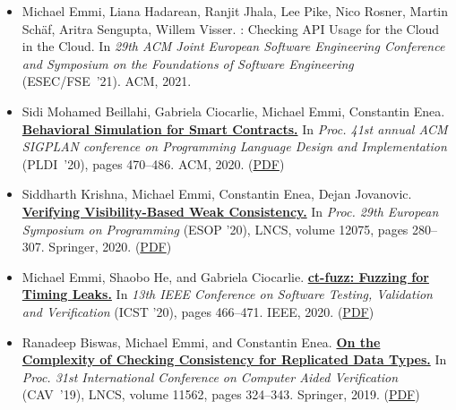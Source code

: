 \documentclass{article}
\begin{document}
  \begin{itemize}[leftmargin=0cm,label={}]

    \item Michael Emmi, Liana Hadarean, Ranjit Jhala, Lee Pike, Nico Rosner, Martin Schäf, Aritra Sengupta, Willem Visser. {\bfRAPID: Checking API Usage for the Cloud in the Cloud.} In \emph{ 29th ACM Joint European Software Engineering Conference and Symposium on the Foundations of Software Engineering } (ESEC/FSE ’21). ACM, 2021. 


    \item Sidi Mohamed Beillahi, Gabriela Ciocarlie, Michael Emmi, Constantin Enea. {\bf\href{%
    https://doi.org/10.1145/3385412.3386022}{%
    Behavioral Simulation for Smart Contracts.}} In \emph{ Proc. 41st annual ACM SIGPLAN conference on Programming Language Design and Implementation } (PLDI ’20), pages 470–486. ACM, 2020. (\href{https://michael-emmi.github.io/https://github.com/michael-emmi/research-papers/raw/master/conf-pldi-BeillahiCEE20.pdf}{PDF})


    \item Siddharth Krishna, Michael Emmi, Constantin Enea, Dejan Jovanovic. {\bf\href{%
    https://doi.org/10.1007/978-3-030-44914-8_11}{%
    Verifying Visibility-Based Weak Consistency.}} In \emph{ Proc. 29th European Symposium on Programming } (ESOP ’20), LNCS, volume 12075, pages 280–307. Springer, 2020. (\href{https://michael-emmi.github.io/https://github.com/michael-emmi/research-papers/raw/master/conf-esop-KrishnaEEJ20.pdf}{PDF})


    \item Michael Emmi, Shaobo He, and Gabriela Ciocarlie. {\bf\href{%
    https://doi.org/10.1109/ICST46399.2020.00063}{%
    ct-fuzz: Fuzzing for Timing Leaks.}} In \emph{ 13th IEEE Conference on Software Testing, Validation and Verification } (ICST ’20), pages 466–471. IEEE, 2020. (\href{https://michael-emmi.github.io/https://github.com/michael-emmi/research-papers/raw/master/conf-icst-HeEC20.pdf}{PDF})


    \item Ranadeep Biswas, Michael Emmi, and Constantin Enea. {\bf\href{%
    https://doi.org/10.1007/978-3-030-25543-5_19}{%
    On the Complexity of Checking Consistency for Replicated Data Types.}} In \emph{ Proc. 31st International Conference on Computer Aided Verification } (CAV ’19), LNCS, volume 11562, pages 324–343. Springer, 2019. (\href{https://michael-emmi.github.io/https://github.com/michael-emmi/research-papers/raw/master/conf-cav-BiswasEE19.pdf}{PDF})



\end{itemize}
\end{document}
